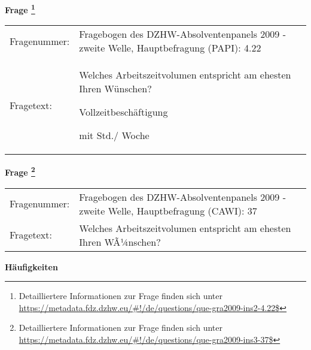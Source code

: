 				\vspace*{0.5cm}
                \noindent\textbf{Frage
	                \footnote{Detailliertere Informationen zur Frage finden sich unter
		              \url{https://metadata.fdz.dzhw.eu/\#!/de/questions/que-gra2009-ins2-4.22$}}}\\
				\begin{tabularx}{\hsize}{@{}lX}
					Fragenummer: &
					  Fragebogen des DZHW-Absolventenpanels 2009 - zweite Welle, Hauptbefragung (PAPI):
					  4.22
 \\
					Fragetext: & Welches Arbeitszeitvolumen entspricht am ehesten Ihren Wünschen?\par  Vollzeitbeschäftigung\par  mit Std./ Woche \\
				\end{tabularx}
				\vspace*{0.5cm}
                \noindent\textbf{Frage
	                \footnote{Detailliertere Informationen zur Frage finden sich unter
		              \url{https://metadata.fdz.dzhw.eu/\#!/de/questions/que-gra2009-ins3-37$}}}\\
				\begin{tabularx}{\hsize}{@{}lX}
					Fragenummer: &
					  Fragebogen des DZHW-Absolventenpanels 2009 - zweite Welle, Hauptbefragung (CAWI):
					  37
 \\
					Fragetext: & Welches Arbeitszeitvolumen entspricht am ehesten Ihren WÃ¼nschen? \\
				\end{tabularx}





        		\vspace*{0.5cm}
                \noindent\textbf{Häufigkeiten}

